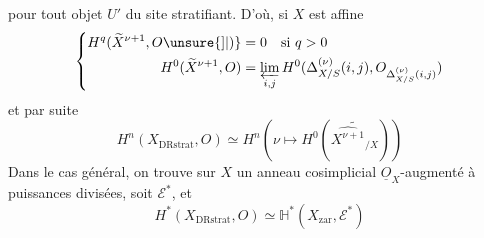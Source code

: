 pour tout objet $U'$ du site stratifiant. D'où, si $X$ est affine
\[
\left\{\begin{aligned}
H^q(\widetilde X^{\nu+1},O\unsure{]|)}&=0\quad\text{si }q>0\\
H^0(\widetilde X^{\nu+1},O)&=\varprojlim_{i,j}H^0(\Delta_{X/S}^{(\nu)}(i,j),O_{\Delta_{X/S}^{(\nu)}(i,j)})
\end{aligned}\right.
\]
et par suite
\[
H^n(X_{\mathrm{DRstrat}},O)\simeq H^n(\nu\longmapsto H^0(\widetilde{\widehat{X^{\nu+1}}_{/X}}))
\]
Dans le cas général, on trouve sur $X$ un anneau cosimplicial $\underline O_X$-augmenté à puissances divisées, soit $\mathcal E^*$, et
\[
H^*(X_{\mathrm{DRstrat}},O)\simeq\mathbb H^*(X_{\mathrm{zar}},\mathcal E^*)
\]
